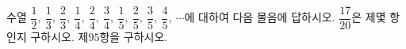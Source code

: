 수열 $\dfrac{1}{2},\ \dfrac{1}{3},\ \dfrac{2}{3},\ \dfrac{1}{4},\ \dfrac{2}{4},\ \dfrac{3}{4},\ \dfrac{1}{5},\ \dfrac{2}{5},\ \dfrac{3}{5},\ \dfrac{4}{5},\ \cdots$에 대하여 다음 물음에 답하시오.
 $\dfrac{17}{20}$은 제몇 항인지 구하시오.
 제$95$항을 구하시오.
